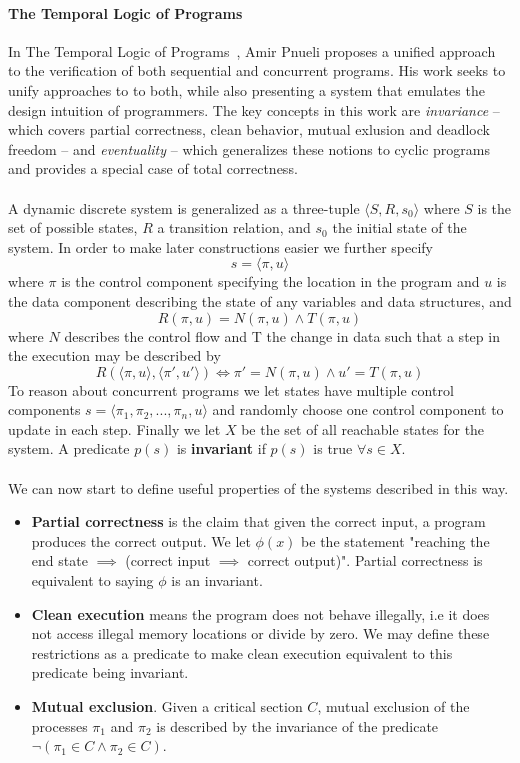 \documentclass{uit-thesis}
\begin{document}
\paragraph{The Temporal Logic of Programs ~\cite{Pnueli1977}}
In The Temporal Logic of Programs~\cite{Pnueli1977}, Amir Pnueli proposes a unified approach to the verification of both sequential and concurrent programs. His work seeks to unify approaches to to both, while also presenting a system that emulates the design intuition of programmers. The key concepts in this work are \textit{invariance} -- which covers partial correctness, clean behavior, mutual exlusion and deadlock freedom -- and \textit{eventuality} -- which generalizes these notions to cyclic programs and provides a special case of total correctness.
\\\\
A dynamic discrete system is generalized as a three-tuple $\langle S, R, s_0 \rangle$ where $S$ is the set of possible states, $R$ a transition relation, and $s_0$ the initial state of the system. In order to make later constructions easier we further specify
$$s = \langle \pi, u \rangle$$ where $\pi$ is the control component specifying the location in the program and $u$ is the data component describing the state of any variables and data structures, and
$$R(\pi, u) = N(\pi, u) \land T(\pi, u)$$ where $N$ describes the control flow and T the change in data such that a step in the execution may be described by
$$R(\langle \pi, u \rangle , \langle \pi', u' \rangle) \iff \pi' = N(\pi, u) \land u' = T(\pi, u)$$
To reason about concurrent programs we let states have multiple control components $s = \langle \pi_1, \pi_2,...,\pi_n, u \rangle$ and randomly choose one control component to update in each step. Finally we let $X$ be the set of all reachable states for the system. A predicate $p(s)$ is \textbf{invariant} if $p(s)$ is true $\forall s \in X$.
\\\\
We can now start to define useful properties of the systems described in this way.
\begin{itemize}[label={}]
    \item \textbf{Partial correctness} is the claim that given the correct input, a program produces the correct output. We let $\phi(x)$ be the statement "reaching the end state $\implies$ (correct input $\implies$ correct output)". Partial correctness is equivalent to saying $\phi$ is an invariant.
    \item \textbf{Clean execution} means the program does not behave illegally, i.e it does not access illegal memory locations or divide by zero. We may define these restrictions as a predicate to make clean execution equivalent to this predicate being invariant.
    \item \textbf{Mutual exclusion}. Given a critical section $C$, mutual exclusion of the processes $\pi_1$ and $\pi_2$ is described by the invariance of the predicate $\lnot(\pi_1 \in C \land \pi_2 \in C)$.
\end{itemize}
\end{document}
